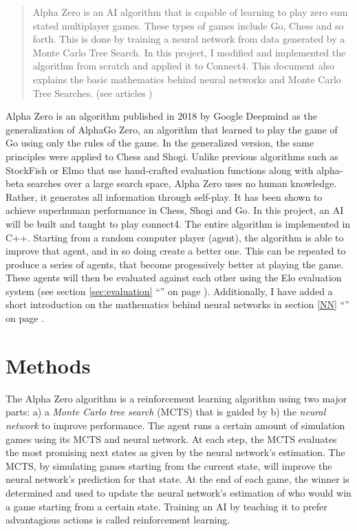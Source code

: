 \documentclass[12pt]{article}
\newcommand{\sectionref}[1]{section \ref{#1} ``\nameref{#1}'' on page \pageref{#1}}
\begin{document}
\maketitle
\begin{abstract}
\noindent Alpha Zero is an AI algorithm that is capable of learning to play zero sum stated multiplayer games. These types of games include Go, Chess and so forth. This is done by training a neural network from data generated by a Monte Carlo Tree Search. In this project, I modified and implemented the algorithm from scratch and applied it to Connect4. This document also explains the basic mathematics behind neural networks and Monte Carlo Tree Searches. (see articles \cite{silver2018general}\cite{silver2017mastering})
\end{abstract}
\newpage
\tableofcontents
\newpage

Alpha Zero is an algorithm published in 2018 by Google Deepmind as the generalization of AlphaGo Zero, an algorithm that learned to play the game of Go using only the rules of the game. In the generalized version, the same principles were applied to Chess and Shogi. Unlike previous algorithms such as StockFish or Elmo that use hand-crafted evaluation functions along with alpha-beta searches over a large search space, Alpha Zero uses no human knowledge. Rather, it generates all information through self-play. It has been shown to achieve superhuman performance in Chess, Shogi and Go. In this project, an AI will be built and taught to play connect4. The entire algorithm is implemented in C++. Starting from a random computer player (agent), the algorithm is able to improve that agent, and in so doing create a better one. This can be repeated to produce a series of agents, that become progessively better at playing the game. These agents will then be evaluated against each other using the Elo evaluation system \cite{elo1978rating} (see \sectionref{sec:evaluation}). Additionally, I have added a short introduction on the mathematics behind neural networks in \sectionref{NN}. 

\newpage
\section{Methods}
\label{Methods}
The Alpha Zero algorithm is a reinforcement learning algorithm using two major parts: a) a {\it Monte Carlo tree search} (MCTS) that is guided by b) the {\it neural network} to improve performance.
The agent runs a certain amount of simulation games using its MCTS and neural network. At each step, the MCTS evaluates the most promising next states as given by the neural network's estimation. The MCTS, by simulating games starting from the current state, will improve the neural network's prediction for that state. At the end of each game, the winner is determined and used to update the neural network's estimation of who would win a game starting from a certain state. Training an AI by teaching it to prefer advantagious actions is called reinforcement learning.
\end{document}
